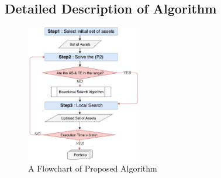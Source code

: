 \documentclass[11pt]{article}
\begin{document}
	\subsection{Detailed Description of Algorithm}
	\begin{figure}[] 
		\begin{center}
			\includegraphics[width=0.45\textwidth]{flowchart}
			\caption{A Flowchart of Proposed Algorithm} \label{fig:flowchart}
		\end{center}
	\end{figure}
\end{document}

